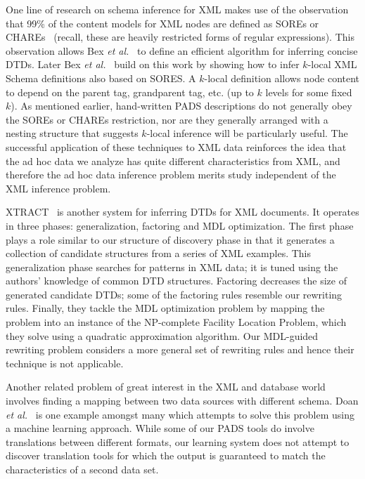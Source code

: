 One line of research on schema inference for XML makes use of the 
observation that 99\% of the content models for XML nodes are defined as
SOREs or CHAREs~\cite{martens+:expressiveness-xml-schema} (recall, these
are heavily restricted forms of regular expressions).  
This observation allows Bex {\em et al.}~\cite{bex+:dtd-inference} to define
an efficient algorithm for inferring concise DTDs.  Later 
Bex {\em et al.}~\cite{bex+:inferring-xml-schema} build on this work 
by showing how to infer $k$-local XML Schema definitions also based on
SORES.  A $k$-local definition allows node content to depend on the parent
tag, grandparent tag, etc. (up to $k$ levels for some fixed $k$).
As mentioned earlier, hand-written PADS descriptions do not generally obey
the SOREs or CHAREs restriction, nor are they generally arranged with a nesting
structure that suggests $k$-local inference will be particularly useful.
The successful application of these techniques to XML data reinforces 
the idea that the ad hoc data we analyze has quite different characteristics
from XML, and therefore the ad hoc data inference problem merits study
independent of the XML inference problem.

XTRACT~\cite{garofalakis+:xtract} is another system for inferring DTDs
for XML documents.  It operates in three phases: generalization,
factoring and MDL optimization.  The first phase plays a role similar to
our structure of discovery phase in that it generates a
collection of candidate structures from a series of XML examples.
This generalization phase searches for patterns in XML
data; it is tuned using the authors' knowledge of common DTD
structures.  Factoring decreases the size of generated candidate DTDs;
some of the factoring rules resemble our rewriting rules.
Finally, they tackle the MDL optimization problem by mapping the
problem into an instance of the NP-complete Facility Location Problem,
which they solve using a quadratic approximation algorithm.
Our MDL-guided rewriting problem considers a more general set of
rewriting rules and hence their technique is not applicable.

Another related problem of great interest in the XML and database world
involves finding a mapping between two data sources with different schema.
Doan {\em et al.}~\cite{doan+:disparate-data-sources} is one example amongst
many which attempts to solve this problem using a machine learning approach.
While some of our PADS tools do involve translations between
different formats, our learning system does not attempt to discover
translation tools for which the output is guaranteed to match 
the characteristics of a second data set.


